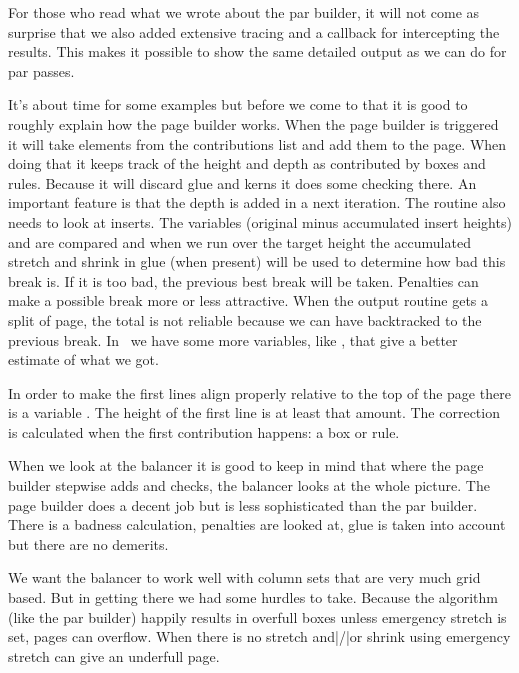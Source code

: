 \startitem
    For those who read what we wrote about the par builder, it will not come as
    surprise that we also added extensive tracing and a callback for intercepting
    the results. This makes it possible to show the same detailed output as we
    can do for par passes.
\stopitem

\stopitemize

It's about time for some examples but before we come to that it is good to
roughly explain how the page builder works. When the page builder is triggered it
will take elements from the contributions list and add them to the page. When
doing that it keeps track of the height and depth as contributed by boxes and
rules. Because it will discard glue and kerns it does some checking there. An
important feature is that the depth is added in a next iteration. The routine
also needs to look at inserts. The variables \type {\pagegoal} (original \type
{\vsize} minus accumulated insert heights) and \type {\pagetotal} are compared
and when we run over the target height the accumulated stretch and shrink in glue
(when present) will be used to determine how bad this break is. If it is too bad,
the previous best break will be taken. Penalties can make a possible break more
or less attractive. When the output routine gets a split of page, the total is
not reliable because we can have backtracked to the previous break. In
\LUAMETATEX\ we have some more variables, like \type {\pagelastheight}, that give
a better estimate of what we got.

In order to make the first lines align properly relative to the top of the page
there is a variable \type {\topskip}. The height of the first line is at least
that amount. The correction is calculated when the first contribution happens: a
box or rule.

When we look at the balancer it is good to keep in mind that where the page
builder stepwise adds and checks, the balancer looks at the whole picture. The
page builder does a decent job but is less sophisticated than the par builder.
There is a badness calculation, penalties are looked at, glue is taken into
account but there are no demerits.

We want the balancer to work well with column sets that are very much grid based.
But in getting there we had some hurdles to take. Because the algorithm (like the
par builder) happily results in overfull boxes unless emergency stretch is set,
pages can overflow. When there is no stretch and|/|or shrink using emergency
stretch can give an underfull page.

